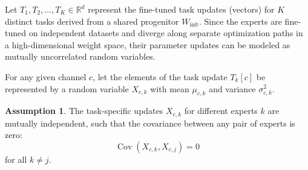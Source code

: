 \documentclass{article}
\theoremstyle{plain}
\theoremstyle{definition}
\newtheorem{assumption}[theorem]{Assumption}
\theoremstyle{remark}
\begin{document}
Let $T_1, T_2, \dots, T_K \in \mathbb{R}^d$ represent the fine-tuned task updates (vectors) for $K$ distinct tasks derived from a shared progenitor $W_{\text{init}}$. Since the experts are fine-tuned on independent datasets and diverge along separate optimization paths in a high-dimensional weight space, their parameter updates can be modeled as mutually uncorrelated random variables. 

For any given channel $c$, let the elements of the task update $T_k[c]$ be represented by a random variable $X_{c,k}$ with mean $\mu_{c,k}$ and variance $\sigma_{c,k}^2$.
\begin{assumption}
The task-specific updates $X_{c,k}$ for different experts $k$ are mutually independent, such that the covariance between any pair of experts is zero:
\begin{equation}
\operatorname{Cov}(X_{c,k}, X_{c,j}) = 0
\end{equation}
for all $k \neq j$.
\end{assumption}
\end{document}

